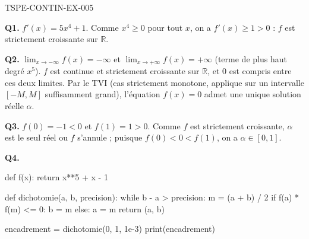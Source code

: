 \begin{corrige}{TSPE-CONTIN-EX-005}

\textbf{Q1.} $f'(x) = 5x^4 + 1$. Comme $x^4 \geq 0$ pour tout $x$, on a $f'(x) \geq 1 > 0$ : $f$ est strictement croissante sur $\mathbb{R}$.

\textbf{Q2.} $\lim_{x \to -\infty} f(x) = -\infty$ et $\lim_{x \to +\infty} f(x) = +\infty$ (terme de plus haut degré $x^5$). $f$ est continue et strictement croissante sur $\mathbb{R}$, et $0$ est compris entre ces deux limites. Par le TVI (cas strictement monotone, applique sur un intervalle $[-M, M]$ suffisamment grand), l'équation $f(x) = 0$ admet une unique solution réelle $\alpha$.

\textbf{Q3.} $f(0) = -1 < 0$ et $f(1) = 1 > 0$. Comme $f$ est strictement croissante, $\alpha$ est le seul réel ou $f$ s'annule ; puisque $f(0)<0<f(1)$, on a $\alpha \in [0,1]$.

\textbf{Q4.}
\begin{python}
def f(x):
    return x**5 + x - 1

def dichotomie(a, b, precision):
    while b - a > precision:
        m = (a + b) / 2
        if f(a) * f(m) <= 0:
            b = m
        else:
            a = m
    return (a, b)

encadrement = dichotomie(0, 1, 1e-3)
print(encadrement)
\end{python}

\end{corrige}
